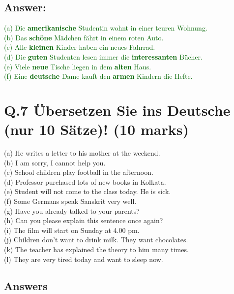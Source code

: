 \documentclass[a4paper,12pt]{article}
\begin{document}
\subsection*{Answer:}
\textcolor{darkgreen}{(a) Die \textbf{amerikanische} Studentin wohnt in einer teuren Wohnung.}\\
\textcolor{darkgreen}{(b) Das \textbf{schöne} Mädchen fährt in einem roten Auto.}\\
\textcolor{darkgreen}{(c) Alle \textbf{kleinen} Kinder haben ein neues Fahrrad.}\\
\textcolor{darkgreen}{(d) Die \textbf{guten} Studenten lesen immer die \textbf{interessanten} Bücher.}\\
\textcolor{darkgreen}{(e) Viele \textbf{neue} Tische liegen in dem \textbf{alten} Haus.}\\
\textcolor{darkgreen}{(f) Eine \textbf{deutsche} Dame kauft den \textbf{armen} Kindern die Hefte.}
\vspace{1cm}

\section*{Q.7 Übersetzen Sie ins Deutsche (nur 10 Sätze)! (10 marks)}

(a) He writes a letter to his mother at the weekend.\\
(b) I am sorry, I cannot help you.\\
(c) School children play football in the afternoon.\\
(d) Professor purchased lots of new books in Kolkata.\\
(e) Student will not come to the class today. He is sick.\\
(f) Some Germans speak Sanskrit very well.\\
(g) Have you already talked to your parents?\\
(h) Can you please explain this sentence once again?\\
(i) The film will start on Sunday at 4.00 pm.\\
(j) Children don't want to drink milk. They want chocolates.\\
(k) The teacher has explained the theory to him many times.\\
(l) They are very tired today and want to sleep now.

\subsection*{Answers}
\end{document}
